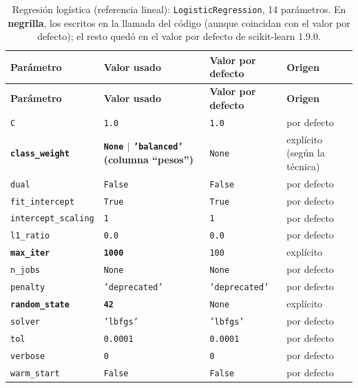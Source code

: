 \documentclass[11pt,a4paper]{article}
\renewcommand{\arraystretch}{1.15}
\begin{document}
{\footnotesize\renewcommand{\arraystretch}{1.0}
\begin{longtable}{L{3.9cm} L{3.7cm} L{3.0cm} L{2.4cm}}
\caption{Regresión logística (referencia lineal): \texttt{LogisticRegression}, 14 parámetros. En \textbf{negrilla}, los escritos en la llamada del código (aunque coincidan con el valor por defecto); el resto quedó en el valor por defecto de scikit-learn 1.9.0.}\label{tab:param-reglog}\\
\toprule
\textbf{Parámetro} & \textbf{Valor usado} & \textbf{Valor por defecto} & \textbf{Origen} \\
\midrule
\endfirsthead
\toprule
\textbf{Parámetro} & \textbf{Valor usado} & \textbf{Valor por defecto} & \textbf{Origen} \\
\midrule
\endhead
\bottomrule
\endfoot
\texttt{C} & \texttt{1.0} & \texttt{1.0} & por defecto \\
\textbf{\texttt{class\_weight}} & \textbf{\texttt{None} $\mid$ \texttt{'balanced'} (columna ``pesos'')} & \texttt{None} & explícito (según la técnica) \\
\texttt{dual} & \texttt{False} & \texttt{False} & por defecto \\
\texttt{fit\_intercept} & \texttt{True} & \texttt{True} & por defecto \\
\texttt{intercept\_scaling} & \texttt{1} & \texttt{1} & por defecto \\
\texttt{l1\_ratio} & \texttt{0.0} & \texttt{0.0} & por defecto \\
\textbf{\texttt{max\_iter}} & \textbf{\texttt{1000}} & \texttt{100} & explícito \\
\texttt{n\_jobs} & \texttt{None} & \texttt{None} & por defecto \\
\texttt{penalty} & \texttt{'deprecated'} & \texttt{'deprecated'} & por defecto \\
\textbf{\texttt{random\_state}} & \textbf{\texttt{42}} & \texttt{None} & explícito \\
\texttt{solver} & \texttt{'lbfgs'} & \texttt{'lbfgs'} & por defecto \\
\texttt{tol} & \texttt{0.0001} & \texttt{0.0001} & por defecto \\
\texttt{verbose} & \texttt{0} & \texttt{0} & por defecto \\
\texttt{warm\_start} & \texttt{False} & \texttt{False} & por defecto \\
\end{longtable}

}
\end{document}
